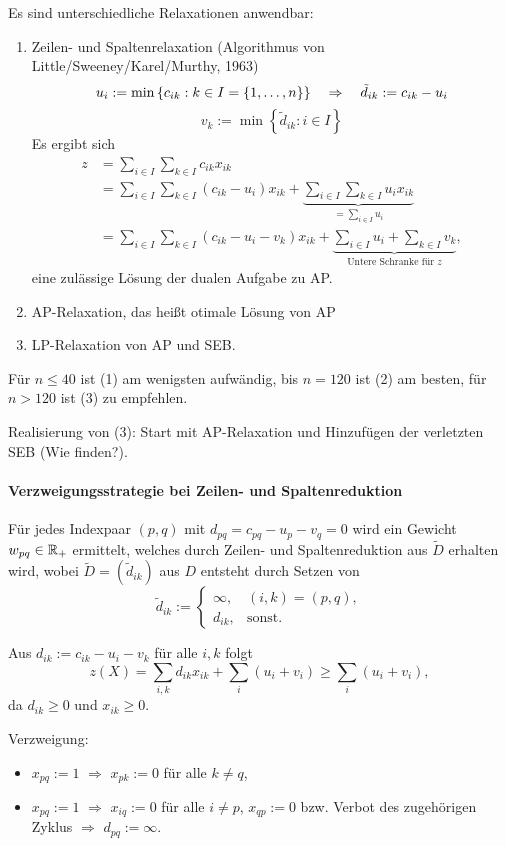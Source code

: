 Es sind unterschiedliche Relaxationen anwendbar:
\begin{enumerate}[(1)]
\item Zeilen- und Spaltenrelaxation (Algorithmus von
  Little/Sweeney/Karel/Murthy, 1963)
  \[ u_i := \min \left\{ c_{ik} : k \in I=\{1, \ldots, n \} \right\}
    \quad \Rightarrow \quad \tilde{d}_{ik} := c_{ik} - u_i \]
  \[ v_k := \min \left\{ \tilde{d}_{ik} : i \in I \right\} \]
  Es ergibt sich
  \begin{align*}
    z &= \sum_{i \in I} \sum_{k \in I} c_{ik} x_{ik} \\
      &= \sum_{i \in I} \sum_{k \in I}( c_{ik} - u_i ) x_{ik}
        + \underbrace{\sum_{i \in I} \sum_{k \in I} u_i x_{ik}}_{=\sum_{i \in I} u_i} \\
      &= \sum_{i \in I} \sum_{k \in I} (c_{ik} - u_i - v_k) x_{ik}
        + \underbrace{\sum_{i \in I} u_i + \sum_{k \in I} v_k}_{\text{Untere Schranke für $z$}},
  \end{align*}
  eine zulässige Lösung der dualen Aufgabe zu AP.
\item AP-Relaxation, das heißt otimale Lösung von AP
\item LP-Relaxation von AP und SEB.
\end{enumerate}
Für $n \le 40$ ist (1) am wenigsten aufwändig, bis $n = 120$ ist (2) am
besten, für $n > 120$ ist (3) zu empfehlen.

Realisierung von (3): Start mit AP-Relaxation und Hinzufügen der verletzten
SEB (Wie finden?).

\paragraph{Verzweigungsstrategie bei Zeilen- und Spaltenreduktion}
Für jedes Indexpaar $(p,q)$ mit $d_{pq} = c_{pq} - u_p - v_q = 0$ wird ein
Gewicht $w_{pq} \in \mathbb{R}_+$ ermittelt, welches durch Zeilen- und
Spaltenreduktion aus $\tilde{D}$ erhalten wird, wobei $\tilde{D} =
(\tilde{d}_{ik})$ aus $D$ entsteht durch Setzen von
\[ \tilde{d}_{ik} :=
  \begin{cases}
    \infty, &(i,k) = (p,q), \\
    d_{ik}, &\text{sonst.}
  \end{cases}
\]

Aus $d_{ik} := c_{ik} - u_i - v_k$ für alle $i, k$ folgt
\[ z(X) = \sum_{i,k} d_{ik} x_{ik} + \sum_{i}(u_i + v_i) \ge \sum_i (u_i +
  v_i), \]
da $d_{ik} \ge 0$ und $x_{ik} \ge 0$.

Verzweigung:
\begin{itemize}
\item $x_{pq} := 1$ $\Rightarrow$ $x_{pk} := 0$ für alle $k \ne q$,
\item $x_{pq} := 1$ $\Rightarrow$ $x_{iq} := 0$ für alle $i \ne p$, $x_{qp} :=
  0$ bzw. Verbot des zugehörigen Zyklus $\Rightarrow$ $d_{pq} := \infty$.
\end{itemize}

